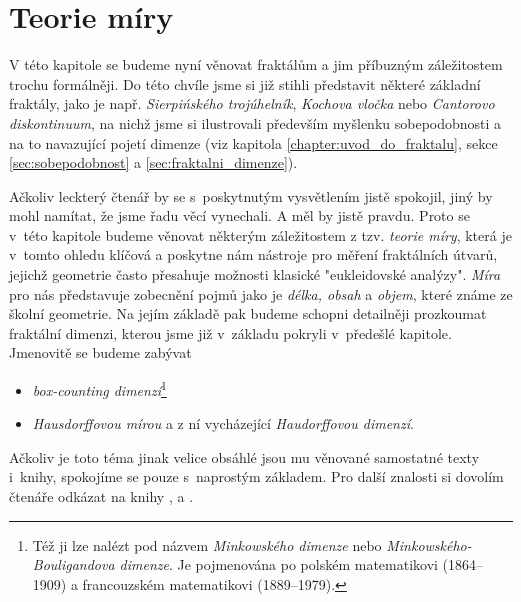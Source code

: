 \chapter{Teorie míry}\label{chapter:teorie-miry}

V této kapitole se budeme nyní věnovat fraktálům a jim příbuzným záležitostem trochu formálněji. Do této chvíle jsme si již stihli představit některé základní fraktály, jako je např. \emph{Sierpińského trojúhelník}, \emph{Kochova vločka} nebo \emph{Cantorovo diskontinuum}, na nichž jsme si ilustrovali především myšlenku sobepodobnosti a na to navazující pojetí dimenze (viz kapitola \ref{chapter:uvod_do_fraktalu}, sekce \ref{sec:sobepodobnost} a \ref{sec:fraktalni_dimenze}).

Ačkoliv leckterý čtenář by se s~poskytnutým vysvětlením jistě spokojil, jiný by mohl namítat, že jsme řadu věcí vynechali. A měl by jistě pravdu. Proto se v~této kapitole budeme věnovat některým záležitostem z tzv. \emph{teorie míry}, která je v~tomto ohledu klíčová a poskytne nám nástroje pro měření fraktálních útvarů, jejichž geometrie často přesahuje možnosti klasické "eukleidovské analýzy". \emph{Míra} pro nás představuje zobecnění pojmů jako je \emph{délka, obsah} a \emph{objem}, které známe ze školní geometrie. Na jejím základě pak budeme schopni detailněji prozkoumat fraktální dimenzi, kterou jsme již v~základu pokryli v~předešlé kapitole. Jmenovitě se budeme zabývat
\begin{itemize}
    \item \emph{box-counting dimenzí}\footnote{Též ji lze nalézt pod názvem \emph{Minkowského dimenze} nebo \emph{Minkowského-Bouligandova dimenze}.  Je pojmenována po polském matematikovi  (1864--1909) a francouzském matematikovi  (1889--1979).} 
    \item \emph{Hausdorffovou mírou} a z ní vycházející \emph{Haudorffovou dimenzí}.
\end{itemize}

Ačkoliv je toto téma jinak velice obsáhlé jsou mu věnované samostatné texty i~knihy, spokojíme se pouze s~naprostým základem. Pro další znalosti si dovolím čtenáře odkázat na knihy \cite{Falconer2014}, \cite{Lukes2013} a \cite{Netuka2016}.


